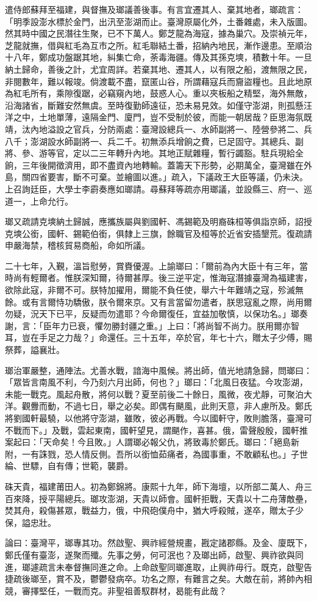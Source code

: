 \begin{pinyinscope}
遣侍郎蘇拜至福建，與督撫及瑯議善後事。有言宜遷其人、棄其地者，瑯疏言：「明季設澎水標於金門，出汛至澎湖而止。臺灣原屬化外，土番雜處，未入版圖。然其時中國之民潛往生聚，已不下萬人。鄭芝龍為海寇，據為巢穴。及崇禎元年，芝龍就撫，借與紅毛為互市之所。紅毛聯結土番，招納內地民，漸作邊患。至順治十八年，鄭成功盤踞其地，糾集亡命，荼毒海疆。傳及其孫克塽，積數十年。一旦納土歸命，善後之計，尤宜周詳。若棄其地、遷其人，以有限之船，渡無限之民，非閱數年，難以報竣。倘渡載不盡，竄匿山谷，所謂藉寇兵而齎盜糧也。且此地原為紅毛所有，乘隙復踞，必竊窺內地，鼓惑人心。重以夾板船之精堅，海外無敵，沿海諸省，斷難安然無虞。至時復勤師遠征，恐未易見效。如僅守澎湖，則孤懸汪洋之中，土地單薄，遠隔金門、廈門，豈不受制於彼，而能一朝居哉？臣思海氛既靖，汰內地溢設之官兵，分防兩處：臺灣設總兵一、水師副將一、陸營參將二、兵八千；澎湖設水師副將一、兵二千。初無添兵增餉之費，已足固守。其總兵、副將、參、游等官，定以二三年轉升內地。其地正賦雜糧，暫行蠲豁。駐兵現給全餉，三年後開徵濟用，即不盡資內地轉輸。蓋籌天下形勢，必期萬全，臺灣雖在外島，關四省要害，斷不可棄。並繪圖以進。」疏入，下議政王大臣等議，仍未決。上召詢廷臣，大學士李霨奏應如瑯請。尋蘇拜等疏亦用瑯議，並設縣三、府一、巡道一，上命允行。

瑯又疏請克塽納土歸誠，應攜族屬與劉國軒、馮錫範及明裔硃桓等俱詣京師，詔授克塽公銜，國軒、錫範伯銜，俱隸上三旗，餘職官及桓等於近省安插墾荒。復疏請申嚴海禁，稽核貿易商船，命如所議。

二十七年，入覲，溫旨慰勞，賞賚優渥。上諭瑯曰：「爾前為內大臣十有三年，當時尚有輕爾者。惟朕深知爾，待爾甚厚。後三逆平定，惟海寇潛據臺灣為福建害，欲除此寇，非爾不可。朕特加擢用，爾能不負任使，舉六十年難靖之寇，殄滅無餘。或有言爾恃功驕傲，朕令爾來京。又有言當留勿遣者，朕思寇亂之際，尚用爾勿疑，況天下已平，反疑而勿遣耶？今命爾復任，宜益加敬慎，以保功名。」瑯奏謝，言：「臣年力已衰，懼勿勝封疆之重。」上曰：「將尚智不尚力。朕用爾亦智耳，豈在手足之力哉？」命還任。三十五年，卒於官，年七十六，贈太子少傅，賜祭葬，謚襄壯。

瑯治軍嚴整，通陣法。尤善水戰，諳海中風候。將出師，值光地請急歸，問瑯曰：「眾皆言南風不利，今乃刻六月出師，何也？」瑯曰：「北風日夜猛。今攻澎湖，未能一戰克。風起舟散，將何以戰？夏至前後二十餘日，風微，夜尤靜，可聚泊大洋。觀釁而動，不過七日，舉之必矣。即偶有颶風，此則天意，非人慮所及。鄭氏將劉國軒最驍，以他將守澎湖，雖敗，彼必再戰。今以國軒守，敗則膽落，臺灣可不戰而下。」及戰，雲起東南，國軒望見，謂颶作，喜甚。俄，雷聲殷殷，國軒推案起曰：「天命矣！今且敗。」人謂瑯必報父仇，將致毒於鄭氏。瑯曰：「絕島新附，一有誅戮，恐人情反側。吾所以銜恤茹痛者，為國事重，不敢顧私也。」子世綸、世驃，自有傳；世範，襲爵。

硃天貴，福建莆田人。初為鄭錦將。康熙十九年，師下海壇，以所部二萬人、舟三百來降，授平陽總兵。瑯攻澎湖，天貴以師會。國軒拒戰，天貴以十二舟薄敵壘，焚其舟，殺傷甚眾，戰益力，俄，中飛砲僕舟中，猶大呼殺賊，遂卒，贈太子少保，謚忠壯。

論曰：臺灣平，瑯專其功。然啟聖、興祚經營規畫，戡定諸郡縣。及金、廈既下，鄭氏僅有臺澎，遂聚而殲。先事之勞，何可泯也？及瑯出師，啟聖、興祚欲與同進，瑯遽疏言未奉督撫同進之命。上命啟聖同瑯進取，止興祚毋行。既克，啟聖告捷疏後瑯至，賞不及，鬱鬱發病卒。功名之際，有難言之矣。大敵在前，將帥內相競，審擇堅任，一戰而克。非聖祖善馭群材，曷能有此哉？


\end{pinyinscope}